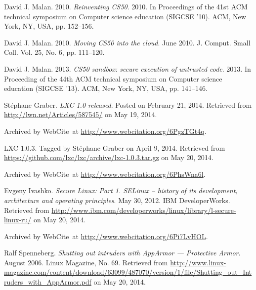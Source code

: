 \begin{thebibliography}{9}

David J. Malan. 2010. \emph{Reinventing CS50}. 2010. In Proceedings of the 41st
ACM technical symposium on Computer science education (SIGCSE '10). ACM, New
York, NY, USA, pp. 152--156. 


David J. Malan. 2010. \emph{Moving CS50 into the cloud}. June 2010. J. Comput.
Small Coll. Vol. 25, No. 6, pp. 111--120.


David J. Malan. 2013. \emph{CS50 sandbox: secure execution of untrusted code}.
2013.  In Proceeding of the 44th ACM technical symposium on Computer science
education (SIGCSE '13). ACM, New York, NY, USA, pp. 141--146.


Stéphane Graber. \emph{LXC 1.0 released}. Posted on February 21, 2014.
Retrieved from \url{http://lwn.net/Articles/587545/} on May 19, 2014.

Archived by WebCite\textsuperscript{\textregistered}\ at
\url{http://www.webcitation.org/6PgzTGt4q}.


LXC 1.0.3. Tagged by Stéphane Graber on April 9, 2014. Retrieved from
\url{https://github.com/lxc/lxc/archive/lxc-1.0.3.tar.gz} on May 20, 2014.

Archived by WebCite\textsuperscript{\textregistered}\ at
\url{http://www.webcitation.org/6PhsWna6l}.


Evgeny Ivashko. \emph{Secure Linux: Part 1. SELinux – history of its
development, architecture and operating principles}. May 30, 2012. IBM
DeveloperWorks. Retrieved from
\url{http://www.ibm.com/developerworks/linux/library/l-secure-linux-ru/} on May
20, 2014.

Archived by WebCite\textsuperscript{\textregistered}\ at
\url{http://www.webcitation.org/6Pi7LvHOL}.


Ralf Spenneberg. \emph{Shutting out intruders with AppArmor --- Protective
Armor}. August 2006. Linux Magazine, No. 69. Retrieved from
\url{http://www.linux-magazine.com/content/download/63099/487070/version/1/file/Shutting_out_Intruders_with_AppArmor.pdf}
on May 20, 2014.


\end{thebibliography}
